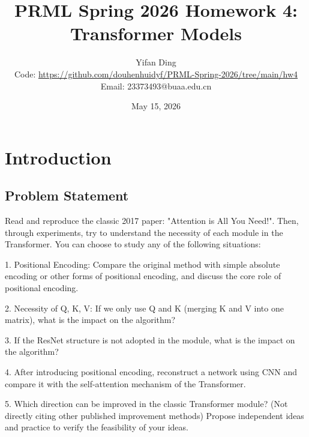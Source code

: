 \documentclass{article}
\title{PRML Spring 2026 Homework 4: Transformer Models}
\author{Yifan Ding \\
        \small Code: \url{https://github.com/douhenhuidyf/PRML-Spring-2026/tree/main/hw4} \\
        \small Email: 23373493@buaa.edu.cn}
\date{May 15, 2026}
\begin{document}
\maketitle




\section{Introduction}
\subsection{Problem Statement}


Read and reproduce the classic 2017 paper: "Attention is All You Need!"\cite{vaswani2023attentionneed}.
Then, through experiments, try to understand the necessity of each module in the Transformer.
You can choose to study any of the following situations:

1. Positional Encoding: Compare the original method with simple absolute encoding or other forms of positional encoding, and discuss the core role of positional encoding.

2. Necessity of Q, K, V: If we only use Q and K (merging K and V into one matrix), what is the impact on the algorithm?

3. If the ResNet structure is not adopted in the module, what is the impact on the algorithm?

4. After introducing positional encoding, reconstruct a network using CNN and compare it with the self-attention mechanism of the Transformer.

5. Which direction can be improved in the classic Transformer module? (Not directly citing other published improvement methods) Propose independent ideas and practice to verify the feasibility of your ideas.
\end{document}
